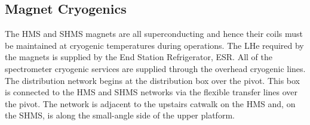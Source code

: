\begin{table}
\begin{center}
\caption{Characteristics of the SHMS Magnets\label{tab:magnet_parameters}}
\end{center}
\end{table}

\subsection {Magnet Cryogenics}

The HMS and SHMS magnets are all
superconducting and hence their coils must be maintained at
cryogenic temperatures during operations. The LHe required by the magnets
is supplied by the End Station Refrigerator, ESR.
All of the spectrometer cryogenic services are supplied through the overhead
cryogenic lines. The distribution network begins at the distribution
box over the pivot. This box is connected to the HMS and SHMS networks via the
flexible transfer lines over the pivot. The network is adjacent to
the upstairs catwalk on the HMS and, on the SHMS, is along the small-angle side
of the upper platform.


